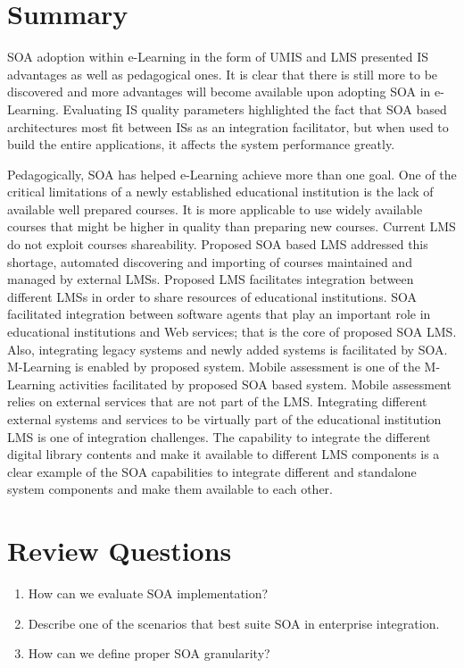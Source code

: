 \documentclass[12pt,a4paper,final,twoside,onecolumn,titlepage]{book}
\begin{document}
\section{Summary}
\gls{SOA} adoption within e-Learning in the form of \gls{UMIS} and \gls{LMS} presented \gls{IS} advantages as well as pedagogical ones. It is clear that there is still more to be discovered and more advantages will become available upon adopting \gls{SOA} in e-Learning. Evaluating \gls{IS} quality parameters highlighted the fact that \gls{SOA} based architectures most fit between \gls{IS}s as an integration facilitator, but when used to build the entire applications, it affects the system performance greatly.

Pedagogically, \gls{SOA} has helped e-Learning achieve more than one goal. One of the critical limitations of a newly established educational institution is the lack of available well prepared courses. It is more applicable to use widely available courses that might be higher in quality than preparing new courses. Current \gls{LMS} do not exploit courses shareability. Proposed \gls{SOA} based \gls{LMS} addressed this shortage, automated discovering and importing of courses maintained and managed by external \gls{LMS}s. Proposed \gls{LMS} facilitates integration between different \gls{LMS}s in order to share resources of educational institutions. \gls{SOA} facilitated integration between software agents that play an important role in educational institutions and Web services; that is the core of proposed \gls{SOA} \gls{LMS}. Also, integrating legacy systems and newly added systems is facilitated by \gls{SOA}. M-Learning is enabled by proposed system. Mobile assessment is one of the M-Learning activities facilitated by proposed \gls{SOA} based system. Mobile assessment relies on external services that are not part of the \gls{LMS}. Integrating different external systems and services to be virtually part of the educational institution \gls{LMS} is one of integration challenges. The capability to integrate the different digital library contents and make it available to different \gls{LMS} components is a clear example of the \gls{SOA} capabilities to integrate different and standalone system components and make them available to each other.

\section{Review Questions}
\begin{enumerate}
\item How can we evaluate \gls{SOA} implementation?
\item Describe one of the scenarios that best suite \gls{SOA} in enterprise integration.
\item How can we define proper \gls{SOA} granularity?
\end{enumerate}
\end{document}
